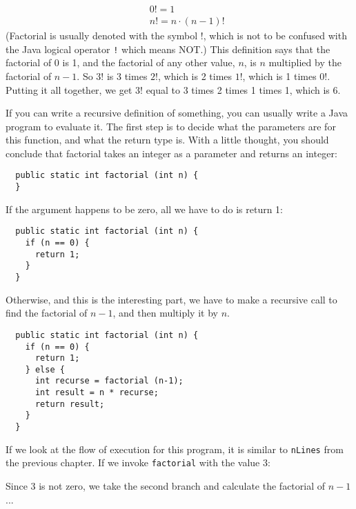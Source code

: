 \documentclass{book}
\begin{document}
\begin{eqnarray*}
&&  0! = 1 \\
&&  n! = n \cdot (n-1)!
\end{eqnarray*}
%
(Factorial is usually denoted with the symbol $!$, which is
not to be confused with the Java logical operator {\tt !} which
means NOT.)  This definition says that the factorial of 0 is 1,
and the factorial of any other value, $n$, is $n$ multiplied
by the factorial of $n-1$.  So $3!$ is 3 times $2!$, which is 2 times
$1!$, which is 1 times $0!$.  Putting it all together, we get
$3!$ equal to 3 times 2 times 1 times 1, which is 6.

If you can write a recursive definition of something, you can usually
write a Java program to evaluate it.  The first step is to decide what
the parameters are for this function, and what the return type is.
With a little thought, you should conclude that factorial takes an
integer as a parameter and returns an integer:

\begin{verbatim}
  public static int factorial (int n) {
  }
\end{verbatim}

\noindent If the argument happens to be zero, all we have to do is
return 1:

\begin{verbatim}
  public static int factorial (int n) {
    if (n == 0) {
      return 1;
    }
  }
\end{verbatim}
%
Otherwise, and this is the interesting part, we have to make
a recursive call to find the factorial of $n-1$, and then
multiply it by $n$.

\begin{verbatim}
  public static int factorial (int n) {
    if (n == 0) {
      return 1;
    } else {
      int recurse = factorial (n-1);
      int result = n * recurse;
      return result;
    }
  }
\end{verbatim}
%
If we look at the flow of execution for this program,
it is similar to {\tt nLines} from the previous chapter.
If we invoke {\tt factorial} with the value 3:

Since 3 is not zero, we take the second branch and calculate
the factorial of $n-1$...
\end{document}
